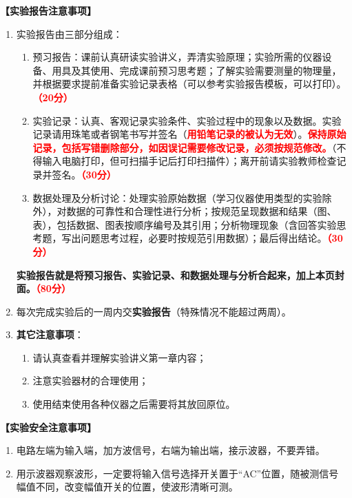 \documentclass[dvipsnames, svgnames,a4paper,11pt]{article}
\begin{document}
	\textbf{【实验报告注意事项】}
	\begin{enumerate}
		\item 实验报告由三部分组成：
		\begin{enumerate}
			\item 预习报告：课前认真研读实验讲义，弄清实验原理；实验所需的仪器设备、用具及其使用、完成课前预习思考题；了解实验需要测量的物理量，并根据要求提前准备实验记录表格（可以参考实验报告模板，可以打印）。\textcolor{red}{\textbf{（20分）}}
			\item 实验记录：认真、客观记录实验条件、实验过程中的现象以及数据。实验记录请用珠笔或者钢笔书写并签名（\textcolor{red}{\textbf{用铅笔记录的被认为无效}}）。\textcolor{red}{\textbf{保持原始记录，包括写错删除部分，如因误记需要修改记录，必须按规范修改。}}（不得输入电脑打印，但可扫描手记后打印扫描件）；离开前请实验教师检查记录并签名。\textcolor{red}{\textbf{（30分）}}
			\item 数据处理及分析讨论：处理实验原始数据（学习仪器使用类型的实验除外），对数据的可靠性和合理性进行分析；按规范呈现数据和结果（图、表），包括数据、图表按顺序编号及其引用；分析物理现象（含回答实验思考题，写出问题思考过程，必要时按规范引用数据）；最后得出结论。\textcolor{red}{\textbf{（30分）}}
		\end{enumerate}
		\textbf{实验报告就是将预习报告、实验记录、和数据处理与分析合起来，加上本页封面。\textcolor{red}{（80分）}}
		\item 每次完成实验后的一周内交\textbf{实验报告}（特殊情况不能超过两周）。
		\item \textbf{其它注意事项}：
		\begin{enumerate}
			\item 请认真查看并理解实验讲义第一章内容；
			\item 注意实验器材的合理使用；
			\item 使用结束使用各种仪器之后需要将其放回原位。
		\end{enumerate}
	\end{enumerate}
	
	\textbf{【实验安全注意事项】}	
	\begin{enumerate}
		\item 电路左端为输入端，加方波信号，右端为输出端，接示波器，不要弄错。
		\item 用示波器观察波形，一定要将输入信号选择开关置于“AC”位置，随被测信号幅值不同，改变幅值开关的位置，使波形清晰可测。
		
	\end{enumerate}
	
	\clearpage
	\tableofcontents
	\clearpage
	
\end{document}
